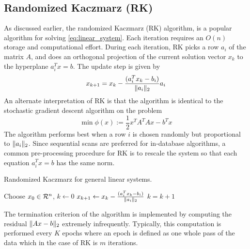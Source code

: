\subsection{Randomized Kaczmarz (RK)}
As discussed earlier, the randomized Kaczmarz (RK) algorithm, is a popular
algorithm for solving \eqref{eq:linear_system}. Each iteration requires an 
$O(n)$ storage and computational effort. During each iteration, RK picks a
row $a_i$ of the matrix $A$, and does an orthogonal projection of the current
solution vector $x_k$ to the hyperplane $a_i^Tx = b$. The update step is given by
$$
x_{k+1} = x_k - \frac{(a_i^T x_k - b_i)}{\| a_i \|_2} a_i
$$
An alternate interpretation of RK is that the algorithm is identical to the 
stochastic gradient  descent algorithm on the problem
$$
  \min \phi(x) := \frac{1}{2} x^T A^T A x - b^T x
$$
The algorithm performs best when a row $i$ is chosen randomly but proportional
to $\| a_i \|_2$. Since sequential scans are preferred for in-database algorithms, 
a common pre-processing procedure for RK is to rescale the system so that each
equation $a_i^Tx = b$ has the same norm.  

\begin{algorithm}[RK]\label{alg:rk}
\caption{Randomized Kaczmarz for general linear systems.}
\begin{algorithmic}
\State Choose $x_0 \in \mathcal{R}^n$, $k \leftarrow 0$ 
\State$x_{k+1} \leftarrow x_k - \frac{(a_i^T x_k - b_i)}{\| a_i \|_2}$ 
  \State$k = k + 1$ 
\EndWhile
\end{algorithmic}
\end{algorithm}

The termination criterion of the algorithm is implemented by computing the 
residual $\| Ax-b \|_2$ extremely infrequently. Typically, this computation
is performed every $K$ epochs where an epoch is defined as one whole pass of 
the data which in the case of RK is $m$ iterations.
